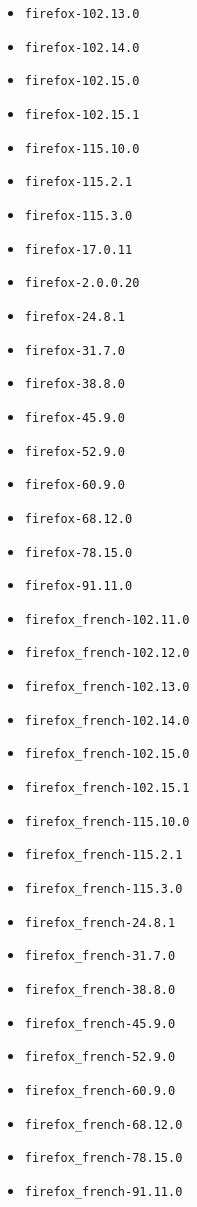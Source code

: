 \begin{itemize}
\item \verb|firefox-102.13.0|
\item \verb|firefox-102.14.0|
\item \verb|firefox-102.15.0|
\item \verb|firefox-102.15.1|
\item \verb|firefox-115.10.0|
\item \verb|firefox-115.2.1|
\item \verb|firefox-115.3.0|
\item \verb|firefox-17.0.11|
\item \verb|firefox-2.0.0.20|
\item \verb|firefox-24.8.1|
\item \verb|firefox-31.7.0|
\item \verb|firefox-38.8.0|
\item \verb|firefox-45.9.0|
\item \verb|firefox-52.9.0|
\item \verb|firefox-60.9.0|
\item \verb|firefox-68.12.0|
\item \verb|firefox-78.15.0|
\item \verb|firefox-91.11.0|
\item \verb|firefox_french-102.11.0|
\item \verb|firefox_french-102.12.0|
\item \verb|firefox_french-102.13.0|
\item \verb|firefox_french-102.14.0|
\item \verb|firefox_french-102.15.0|
\item \verb|firefox_french-102.15.1|
\item \verb|firefox_french-115.10.0|
\item \verb|firefox_french-115.2.1|
\item \verb|firefox_french-115.3.0|
\item \verb|firefox_french-24.8.1|
\item \verb|firefox_french-31.7.0|
\item \verb|firefox_french-38.8.0|
\item \verb|firefox_french-45.9.0|
\item \verb|firefox_french-52.9.0|
\item \verb|firefox_french-60.9.0|
\item \verb|firefox_french-68.12.0|
\item \verb|firefox_french-78.15.0|
\item \verb|firefox_french-91.11.0|

\end{itemize}
